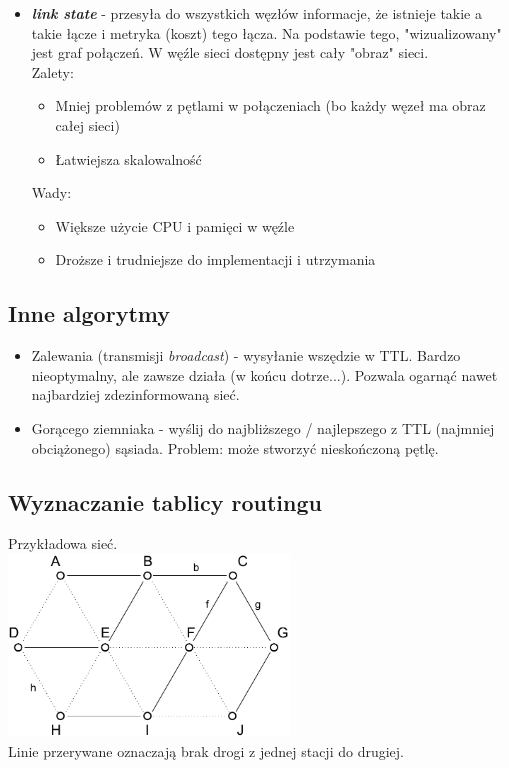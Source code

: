 \begin{itemize}
\begin{itemize}
						\item \textbf{\emph{link state}} - przesyła do wszystkich węzłów informacje, że istnieje takie a takie łącze i metryka (koszt) tego łącza. Na podstawie tego, "wizualizowany" jest graf połączeń. W węźle sieci dostępny jest cały "obraz" sieci. \\
						Zalety:
						\begin{itemize}
							\item Mniej problemów z pętlami w połączeniach (bo każdy węzeł ma obraz całej sieci)
							\item Łatwiejsza skalowalność
							\end{itemize}
						Wady:
						\begin{itemize}
							\item Większe użycie CPU i pamięci w węźle
							\item Droższe i trudniejsze do implementacji i utrzymania
						\end{itemize}
					\end{itemize}
				\end{itemize}
		\subsection{Inne algorytmy}
			\begin{itemize}
				\item Zalewania (transmisji \emph{broadcast}) - wysyłanie wszędzie w TTL. Bardzo nieoptymalny, ale zawsze działa (w końcu dotrze...). Pozwala ogarnąć nawet najbardziej zdezinformowaną sieć.
				\item Gorącego ziemniaka - wyślij do najbliższego / najlepszego z TTL (najmniej obciążonego) sąsiada. Problem: może stworzyć nieskończoną pętlę.
			\end{itemize}
		\subsection{Wyznaczanie tablicy routingu}
			Przykładowa sieć.\\
			\includegraphics[width=7.5cm]{./images/image38.pdf}\\
			Linie przerywane oznaczają brak drogi z jednej stacji do drugiej.

